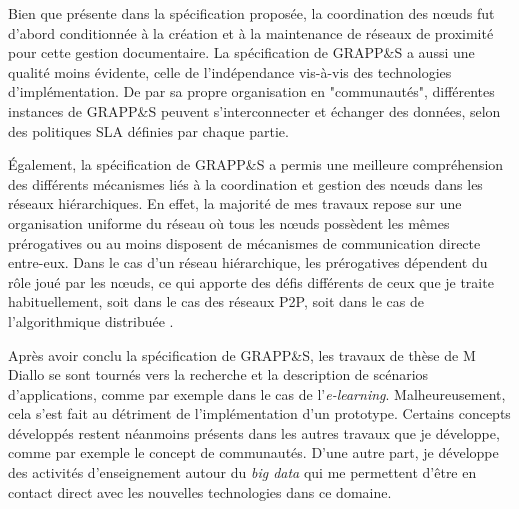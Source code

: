 Bien que présente dans la spécification proposée, la coordination des n{\oe}uds fut d'abord conditionnée à la création et à la maintenance de réseaux de proximité pour cette gestion documentaire. La spécification de GRAPP\&S a aussi une qualité moins évidente, celle de l'indépendance vis-à-vis des technologies d'implémentation. De par sa propre organisation en "communautés", différentes instances de GRAPP\&S peuvent s'interconnecter et échanger des données, selon des politiques SLA définies par chaque partie.   

Également, la spécification de GRAPP\&S a permis une meilleure compréhension des différents mécanismes liés à la coordination et gestion des n{\oe}uds dans les réseaux hiérarchiques. En effet, la majorité de mes travaux repose sur une organisation uniforme du réseau où tous les n{\oe}uds possèdent les mêmes prérogatives ou au moins disposent de mécanismes de communication directe entre-eux. Dans le cas d'un réseau hiérarchique, les prérogatives dépendent du rôle joué par les n{\oe}uds, ce qui apporte des défis différents de ceux que je traite habituellement, soit dans le cas des réseaux P2P, soit dans le cas de l'algorithmique distribuée \cite{Steffenel08a,Steffenel09c}. 

Après avoir conclu la spécification de GRAPP\&S, les travaux de thèse de M Diallo se sont tournés vers la recherche et la description de scénarios d'applications, comme par exemple dans le cas de l'\textit{e-learning}. Malheureusement, cela s'est fait au détriment de l'implémentation d'un prototype.  Certains concepts développés restent néanmoins présents dans les autres travaux que je développe, comme par exemple le concept de communautés.  D'une autre part, je développe des activités d'enseignement autour du \textit{big data} qui me permettent d'être en contact direct avec les nouvelles technologies dans ce domaine.